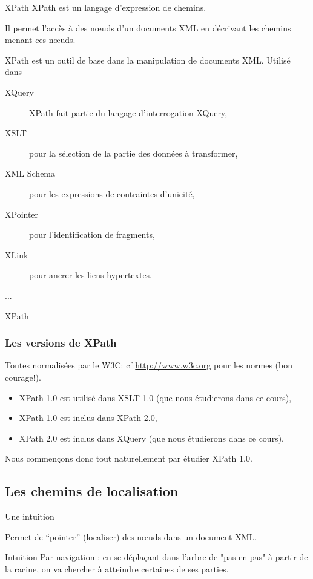 
\begin{frame}{XPath}
XPath est un langage \alert{d'expression de chemins}.

\vfill

Il permet l'accès à des 
 n{\oe}uds d’un documents XML en décrivant les chemins menant ces n{\oe}uds.

\vfill

XPath est un outil de base dans la manipulation de documents XML. Utilisé dans 
\begin{description}
\item[XQuery] XPath fait partie du langage d’interrogation XQuery,
\item[XSLT] pour la sélection de la partie des données à transformer,
\item[XML Schema] pour les expressions de contraintes d’unicité,
\item[XPointer] pour l'identification de fragments,
\item[XLink] pour ancrer les liens hypertextes,
\item[...]
\end{description}
\end{frame}


\begin{frame}{XPath}
\frametitle{Les versions de XPath}

Toutes normalisées par le W3C: cf \url{http://www.w3c.org} pour les normes (bon courage!).

\begin{itemize}
\item XPath 1.0 est utilisé dans XSLT 1.0 (que nous étudierons dans ce cours),
\item XPath 1.0 est inclus dans XPath 2.0,
\item XPath 2.0 est inclus dans XQuery (que nous étudierons dans ce cours).
\end{itemize}

Nous commen\c{c}ons donc tout naturellement par étudier XPath 1.0.
\end{frame}


\subsection{Les chemins de localisation}

\begin{frame}{Une intuition}

Permet de ``pointer'' (localiser) des n{\oe}uds dans un document XML.

\begin{exampleblock}{Intuition}
Par \alert{navigation} : en se déplaçant dans l'arbre de "pas en pas" à partir de la racine, on va chercher à 
   atteindre certaines de ses parties.
\end{exampleblock}

\end{frame}

